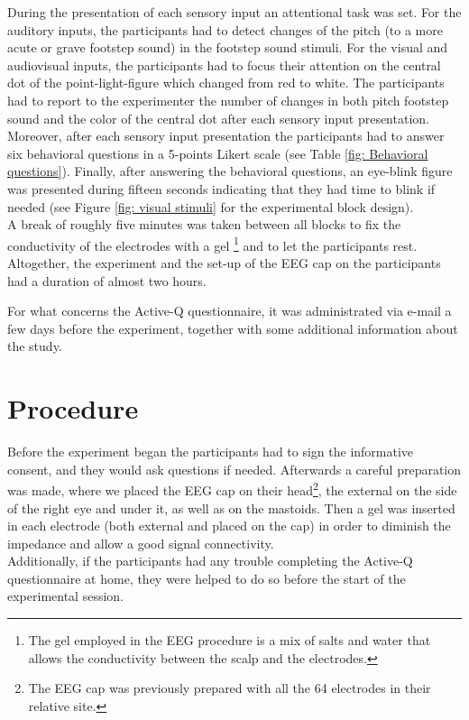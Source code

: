 During the presentation of each sensory input an attentional task was set. For the auditory inputs, the participants had to detect changes of the pitch (to a more acute or grave footstep sound) in the footstep sound stimuli. For the visual and audiovisual inputs, the participants had to focus their attention on the central dot of the point-light-figure which changed from red to white. The participants had to report to the experimenter the number of changes in both pitch footstep sound and the color of the central dot after each sensory input presentation.  \\
Moreover, after each sensory input presentation the participants had to answer six behavioral questions in a 5-points Likert scale (see Table \ref{fig: Behavioral questions}). Finally, after answering the behavioral questions, an eye-blink figure was presented during fifteen seconds indicating that they had time to blink if needed (see Figure \ref{fig: visual stimuli} for the experimental block design).  \\
A break of roughly five minutes was taken between all blocks to fix the conductivity of the electrodes with a gel \footnote{The gel employed in the EEG procedure is a mix of salts and water that allows the conductivity between the scalp and the electrodes.} and to let the participants rest. Altogether, the experiment and the set-up of the EEG cap on the participants had a duration of almost two hours.

For what concerns the Active-Q questionnaire, it was administrated via e-mail a few days before the experiment, together with some additional information about the study.

\section{Procedure}
Before the experiment began the participants had to sign the informative consent, and they would ask questions if needed. Afterwards a careful preparation was made, where we placed the EEG cap on their head\footnote{The EEG cap was previously prepared with all the 64 electrodes in their relative site.}, the external on the side of the right eye and under it, as well as on the mastoids. Then a gel was inserted in each electrode (both external and placed on the cap) in order to diminish the impedance and allow a good signal connectivity. \\
Additionally, if the participants had any trouble completing the Active-Q questionnaire at home, they were helped to do so before the start of the experimental session. 

